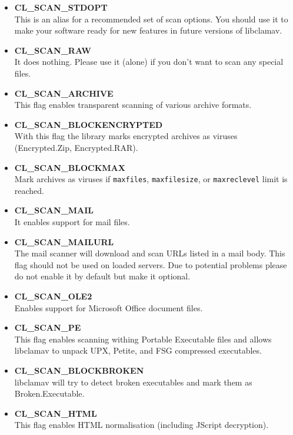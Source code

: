 \documentclass[a4paper,titlepage,12pt]{article}
\begin{document}
    \begin{itemize}
	\item \textbf{CL\_SCAN\_STDOPT}\\
	      This is an alias for a recommended set of scan options. You
	      should use it to make your software ready for new features
	      in future versions of libclamav.
	\item \textbf{CL\_SCAN\_RAW}\\
	      It does nothing. Please use it (alone) if you don't want
	      to scan any special files.
	\item \textbf{CL\_SCAN\_ARCHIVE}\\
	      This flag enables transparent scanning of various archive formats.
	\item \textbf{CL\_SCAN\_BLOCKENCRYPTED}\\
	      With this flag the library marks encrypted archives as viruses
	      (Encrypted.Zip, Encrypted.RAR).
	\item \textbf{CL\_SCAN\_BLOCKMAX}\\
	      Mark archives as viruses if \verb+maxfiles+, \verb+maxfilesize+,
	      or \verb+maxreclevel+ limit is reached.
	\item \textbf{CL\_SCAN\_MAIL}\\
	      It enables support for mail files.
	\item \textbf{CL\_SCAN\_MAILURL}\\
	      The mail scanner will download and scan URLs listed in a mail
	      body. This flag should not be used on loaded servers. Due to
	      potential problems please do not enable it by default but make
	      it optional.
	\item \textbf{CL\_SCAN\_OLE2}\\
	      Enables support for Microsoft Office document files.
	\item \textbf{CL\_SCAN\_PE}\\
	      This flag enables scanning withing Portable Executable files and
	      allows libclamav to unpack UPX, Petite, and FSG compressed
	      executables.
	\item \textbf{CL\_SCAN\_BLOCKBROKEN}\\
	      libclamav will try to detect broken executables and mark them as
	      Broken.Executable.
	\item \textbf{CL\_SCAN\_HTML}\\
	      This flag enables HTML normalisation (including JScript
	      decryption).
    \end{itemize}
\end{document}
